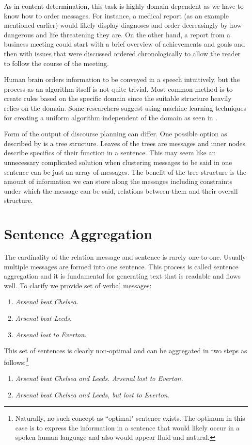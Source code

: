 As in content determination, this task is highly domain-dependent as we have to know how to order messages. For instance, a medical report (as an example mentioned earlier) would likely display diagnoses and order decreasingly by how dangerous and life threatening they are. On the other hand, a report from a business meeting could start with a brief overview of achievements and goals and then with issues that were discussed ordered chronologically to allow the reader to follow the course of the meeting.

Human brain orders information to be conveyed in a speech intuitively, but the process as an algorithm itself is not quite trivial. Most common method is to create rules based on the specific domain since the suitable structure heavily relies on the domain. Some researchers suggest using machine learning techniques for creating a  uniform algorithm independent of the domain as seen in \citet{dimitromanolaki2003learning}.

Form of the output of discourse planning can differ. One possible option as described by \citet{reiter1997building} is a tree structure. Leaves of the trees are messages and inner nodes describe specifics of their function in a sentence. This may seem like an unnecessary complicated solution when clustering messages to be said in one sentence can be just an array of messages. The benefit of the tree structure is the amount of information we can store along the messages including constraints under which the message can be said, relations between them and their overall structure.

\section{Sentence Aggregation}\label{section:sa}
The cardinality of the relation message and sentence is rarely one-to-one. Usually multiple messages are formed into one sentence. This process is called sentence aggregation and it is fundamental for generating text that is readable and flows well. To clarify we provide set of verbal messages:
\begin{enumerate}
	\item \emph{Arsenal beat Chelsea.}\label{sa-one}
	\item \emph{Arsenal beat Leeds.}\label{sa-two}
	\item \emph{Arsenal lost to Everton.}\label{sa-three}	
\end{enumerate}

This set of sentences is clearly non-optimal and can be aggregated in two steps as follows:\footnote{\label{footnote-opt}Naturally, no such concept as ``optimal" sentence exists. The optimum in this case is to express the information in a sentence that would likely occur in a spoken human language and also would appear fluid and natural.}
\begin{enumerate}[resume]
	\item \emph{Arsenal beat Chelsea and Leeds. Arsenal lost to Everton.}\label{sa-four}
	\item \emph{Arsenal beat Chelsea and Leeds, but lost to Everton.}\label{sa-five}	
\end{enumerate}


